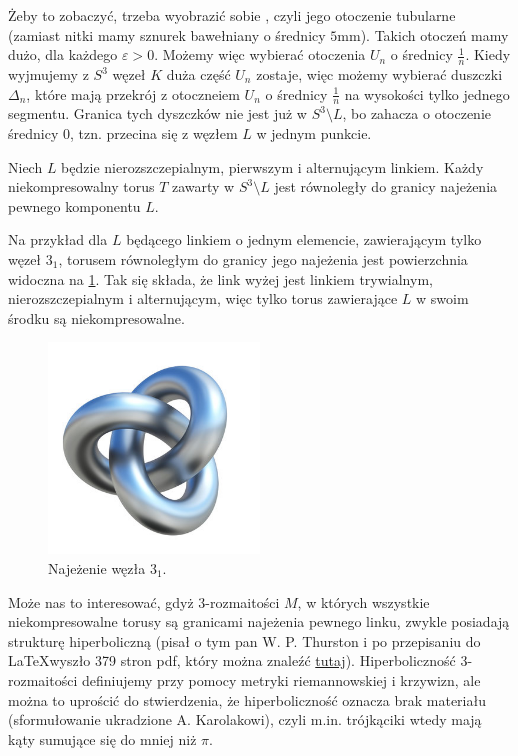 \documentclass{article}
\begin{document}
Żeby to zobaczyć, trzeba wyobrazić sobie , czyli jego otoczenie tubularne (zamiast nitki mamy sznurek bawełniany o średnicy $5$mm). Takich otoczeń mamy dużo, dla każdego $\varepsilon>0$. Możemy więc wybierać otoczenia $U_n$ o średnicy $\frac{1}{n}$. Kiedy wyjmujemy z $S^3$ węzeł $K$ duża część $U_n$ zostaje, więc możemy wybierać duszczki $\Delta_n$, które mają przekrój z otoczneiem $U_n$ o średnicy $\frac{1}{n}$ na wysokości tylko jednego segmentu. Granica tych dyszczków nie jest już w $S^3\setminus L$, bo zahacza o otoczenie średnicy $0$, tzn. przecina się z węzłem $L$ w jednym punkcie.

\begin{fuck}
  Niech $L$ będzie nierozszczepialnym, pierwszym i alternującym linkiem. Każdy niekompresowalny torus $T$ zawarty w $S^3\setminus L$ jest równoległy do granicy najeżenia pewnego komponentu $L$.
\end{fuck}

Na przykład dla $L$ będącego linkiem o jednym elemencie, zawierającym tylko węzeł $3_1$, torusem równoległym do granicy jego najeżenia jest powierzchnia widoczna na \cref{najezenie trefoil}. Tak się składa, że link wyżej jest linkiem trywialnym, nierozszczepialnym i alternującym, więc tylko torus zawierające $L$ w swoim środku są niekompresowalne.

\begin{figure}[h]\centering
  \includegraphics[width=0.5\textwidth]{trefoil-3d.jpg}
  \caption{\label{najezenie trefoil}Najeżenie węzła $3_1$.}
\end{figure}

Może nas to interesować, gdyż $3$-rozmaitości $M$, w których wszystkie niekompresowalne torusy są granicami najeżenia pewnego linku, zwykle posiadają strukturę hiperboliczną (pisał o tym pan W. P. Thurston i po przepisaniu do \LaTeX wyszło 379 stron pdf, który można znaleźć \href{https://www.math.unl.edu/~jkettinger2/thurston.pdf}{tutaj}). Hiperboliczność $3$-rozmaitości definiujemy przy pomocy metryki riemannowskiej i krzywizn, ale można to uprościć do stwierdzenia, że hiperboliczność oznacza brak materiału (sformułowanie ukradzione A. Karolakowi), czyli m.in. trójkąciki wtedy mają kąty sumujące się do mniej niż $\pi$.
\end{document}
